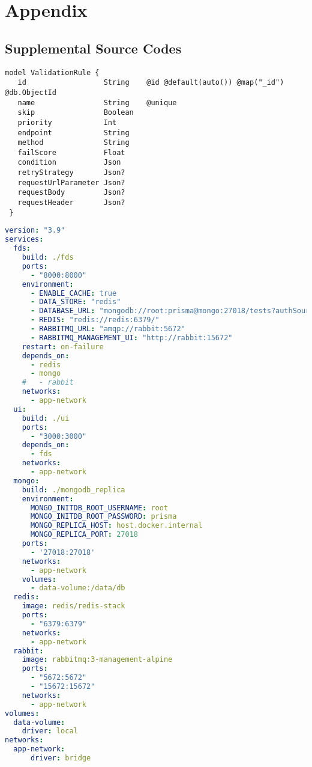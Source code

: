 \appendix
{}

\chapter{Appendix}

 \section{Supplemental Source Codes}
 
  \begin{lstlisting}[caption={\emph{Prisma} schema of a validation rule (Prisma)}, label={code:prisma}]
 model ValidationRule {
   id                  String    @id @default(auto()) @map("_id") @db.ObjectId
   name                String    @unique
   skip                Boolean
   priority            Int
   endpoint            String
   method              String
   failScore           Float
   condition           Json
   retryStrategy       Json?
   requestUrlParameter Json?
   requestBody         Json?
   requestHeader       Json?
 }
  \end{lstlisting}
 
  \newpage
  \begin{lstlisting}[caption={Docker Compose usage (YAML)}, label={code:compose}, language=yaml]
version: "3.9"
services:
  fds:
    build: ./fds
    ports:
      - "8000:8000"
    environment:
      - ENABLE_CACHE: true
      - DATA_STORE: "redis"
      - DATABASE_URL: "mongodb://root:prisma@mongo:27018/tests?authSource=admin/"
      - REDIS: "redis://redis:6379/"
      - RABBITMQ_URL: "amqp://rabbit:5672"
      - RABBITMQ_MANAGEMENT_UI: "http://rabbit:15672"
    restart: on-failure
    depends_on:
      - redis
      - mongo
    #   - rabbit
    networks:
      - app-network
  ui:
    build: ./ui
    ports: 
      - "3000:3000"
    depends_on: 
      - fds
    networks:
      - app-network  
  mongo:
    build: ./mongodb_replica
    environment:
      MONGO_INITDB_ROOT_USERNAME: root
      MONGO_INITDB_ROOT_PASSWORD: prisma
      MONGO_REPLICA_HOST: host.docker.internal
      MONGO_REPLICA_PORT: 27018
    ports:
      - '27018:27018'
    networks:
      - app-network
    volumes:
      - data-volume:/data/db
  redis:
    image: redis/redis-stack
    ports:
      - "6379:6379"
    networks: 
      - app-network
  rabbit:
    image: rabbitmq:3-management-alpine
    ports:
      - "5672:5672"
      - "15672:15672"
    networks:
      - app-network
volumes:
  data-volume:
    driver: local
networks:
  app-network:
      driver: bridge
  \end{lstlisting}

